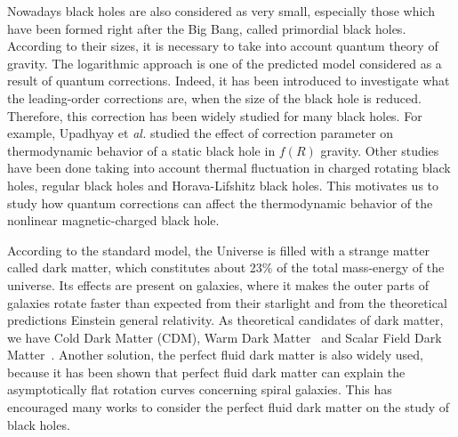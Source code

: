 \documentclass[10pt,letterpaper]{article}
\begin{document}
Nowadays black holes are also considered as very small, especially those which have been formed right after the Big Bang, called primordial black holes\cite{khlopov2010primordial}. According to their sizes, it is necessary to take into account quantum theory of gravity. The logarithmic approach is one of the predicted model considered as a result of quantum corrections\cite{das2002general,Sudhanshu2022corrected,abbas2023thermal}. Indeed, it has been introduced to investigate what the leading-order corrections are, when the size of the black hole is reduced. Therefore, this correction has been widely studied for many black holes. For example, Upadhyay et \textit{al.} studied the effect of correction parameter on thermodynamic behavior of a static black hole in $f(R)$ gravity\cite{upadhyay2021perturbed}. Other studies have been done taking into account thermal fluctuation in charged rotating black holes\cite{upadhyay2018leading}, regular black holes\cite{singh2021logarthmic} and Horava-Lifshitz black holes\cite{pourhassan2018quantum}. This motivates us to study how quantum corrections can affect the thermodynamic behavior of the nonlinear magnetic-charged black hole.

According to the standard model, the Universe is filled with a strange matter called dark matter, which constitutes about 23$\%$ of the total mass-energy of the universe\cite{xu2018kerr}. Its effects are present on galaxies, where it makes the outer parts of galaxies rotate faster than expected from their starlight and from the theoretical predictions Einstein general relativity. As theoretical candidates of dark matter, we have Cold Dark Matter (CDM)\cite{navarro1997universal}, Warm Dark Matter~\cite{dutta2021decaying,ruiz2021scalar} and Scalar Field Dark Matter~\cite{paranjape2021quantum,padilla2021consequences}. Another solution, the perfect fluid dark matter is also widely used, because it has been shown that perfect fluid dark matter can explain the asymptotically flat rotation curves concerning spiral galaxies\cite{siddhartha2003quintessence}. This has encouraged many works to consider the perfect fluid dark matter on the study of black holes\cite{saurabh2021imprints,shaymatov2021testing,ghosh2021charged,ma2021shadow}. 



\end{document}
